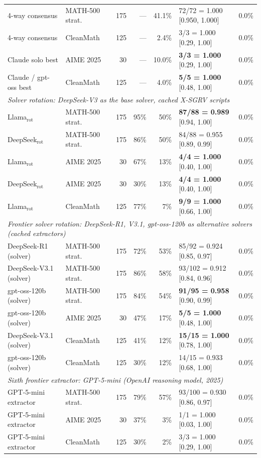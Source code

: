 \documentclass{article}
\begin{document}
\begin{table}[t]
\begin{tabular}{llrrrlr}
4-way consensus & MATH-500 strat. & 175 & --- & 41.1\% & 72/72 = 1.000 [0.950, 1.000] & 0.0\% \\
4-way consensus & CleanMath & 125 & --- & 2.4\% & 3/3 = 1.000 [0.29, 1.00] & 0.0\% \\
Claude solo best & AIME 2025 & 30 & --- & 10.0\% & \textbf{3/3 = 1.000} [0.29, 1.00] & 0.0\% \\
Claude / gpt-oss best & CleanMath & 125 & --- & 4.0\% & \textbf{5/5 = 1.000} [0.48, 1.00] & 0.0\% \\
\midrule
\multicolumn{7}{l}{\emph{Solver rotation: DeepSeek-V3 as the base solver, cached X-SGRV scripts}}\\
Llama$_{\text{rot}}$ & MATH-500 strat. & 175 & 95\% & 50\% & \textbf{87/88 = 0.989} [0.94, 1.00] & 0.0\% \\
DeepSeek$_{\text{rot}}$ & MATH-500 strat. & 175 & 86\% & 50\% & 84/88 = 0.955 [0.89, 0.99] & 0.0\% \\
Llama$_{\text{rot}}$ & AIME 2025 & 30 & 67\% & 13\% & \textbf{4/4 = 1.000} [0.40, 1.00] & 0.0\% \\
DeepSeek$_{\text{rot}}$ & AIME 2025 & 30 & 30\% & 13\% & \textbf{4/4 = 1.000} [0.40, 1.00] & 0.0\% \\
Llama$_{\text{rot}}$ & CleanMath & 125 & 77\% & 7\% & \textbf{9/9 = 1.000} [0.66, 1.00] & 0.0\% \\
\midrule
\multicolumn{7}{l}{\emph{Frontier solver rotation: DeepSeek-R1, V3.1, gpt-oss-120b as alternative solvers (cached extractors)}}\\
DeepSeek-R1 (solver)   & MATH-500 strat. & 175 & 72\% & 53\% & 85/92 = 0.924 [0.85, 0.97] & 0.0\% \\
DeepSeek-V3.1 (solver) & MATH-500 strat. & 175 & 86\% & 58\% & 93/102 = 0.912 [0.84, 0.96] & 0.0\% \\
gpt-oss-120b (solver)  & MATH-500 strat. & 175 & 84\% & 54\% & \textbf{91/95 = 0.958} [0.90, 0.99] & 0.0\% \\
gpt-oss-120b (solver)  & AIME 2025 & 30 & 47\% & 17\% & \textbf{5/5 = 1.000} [0.48, 1.00] & 0.0\% \\
DeepSeek-V3.1 (solver) & CleanMath & 125 & 41\% & 12\% & \textbf{15/15 = 1.000} [0.78, 1.00] & 0.0\% \\
gpt-oss-120b (solver)  & CleanMath & 125 & 30\% & 12\% & 14/15 = 0.933 [0.68, 1.00] & 0.0\% \\
\midrule
\multicolumn{7}{l}{\emph{Sixth frontier extractor: GPT-5-mini (OpenAI reasoning model, 2025)}}\\
GPT-5-mini extractor & MATH-500 strat. & 175 & 79\% & 57\% & 93/100 = 0.930 [0.86, 0.97] & 0.0\% \\
GPT-5-mini extractor & AIME 2025 & 30 & 37\% & 3\% & 1/1 = 1.000 [0.03, 1.00] & 0.0\% \\
GPT-5-mini extractor & CleanMath & 125 & 30\% & 2\% & 3/3 = 1.000 [0.29, 1.00] & 0.0\% \\
\bottomrule
\end{tabular}
\end{table}
\end{document}
